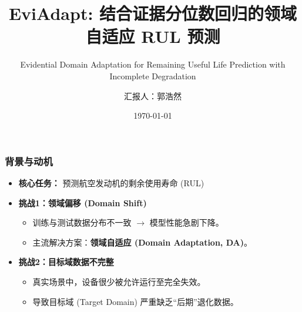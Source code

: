 \documentclass{beamer}
\title[EviAdapt]{EviAdapt: 结合证据分位数回归的领域自适应 RUL 预测}
\subtitle{Evidential Domain Adaptation for Remaining Useful Life Prediction with Incomplete Degradation}
\author{汇报人：郭浩然}
\institute{ 西北工业大学 民航学院 }
\date{\today}
\begin{document}
\begin{frame}
    \titlepage
\end{frame}

\begin{frame}
    \frametitle{背景与动机}
    \begin{itemize}
        \item \textbf{核心任务：} 预测航空发动机的剩余使用寿命 (RUL) 

        \item \textbf{挑战1：领域偏移 (Domain Shift)}
        \begin{itemize}
            \item 训练与测试数据分布不一致 $\rightarrow$ 模型性能急剧下降。
            \item 主流解决方案：\textbf{领域自适应 (Domain Adaptation, DA)}。
        \end{itemize}

        \item \textbf{挑战2：目标域数据不完整}
        \begin{itemize}
            \item 真实场景中，设备很少被允许运行至完全失效。
            \item 导致目标域 (Target Domain) 严重缺乏“后期”退化数据。
        \end{itemize}
    \end{itemize}
\end{frame}
\end{document}
